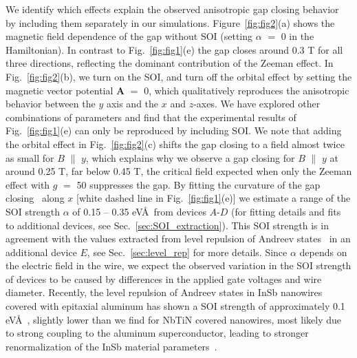 We identify which effects explain the observed anisotropic gap closing behavior by including them separately in our simulations.
Figure~\ref{fig:fig2}(a) shows the magnetic field dependence of the gap without SOI (setting $\alpha$ $=$ 0 in the Hamiltonian).
In contrast to Fig.~\ref{fig:fig1}(e) the gap closes around 0.3 T for all three directions, reflecting the dominant contribution of the Zeeman effect.
In Fig.~\ref{fig:fig2}(b), we turn on the SOI, and turn off the orbital effect by setting the magnetic vector potential $\mathbf{A}$ $=$ 0, which qualitatively reproduces the anisotropic behavior between the $y$ axis and the $x$ and $z$-axes.
We have explored other combinations of parameters and find that the experimental results of Fig.~\ref{fig:fig1}(e) can only be reproduced by including SOI.
We note that adding the orbital effect in Fig.~\ref{fig:fig2}(c) shifts the gap closing to a field almost twice as small for $B$ $\parallel$ $y$, which explains why we observe a gap closing for $B$ $\parallel$ $y$ at around 0.25 T, far below 0.45 T, the critical field expected when only the Zeeman effect with $g$ $=$ 50 suppresses the gap.
By fitting the curvature of the gap closing~\cite{Heck2017,Pan2019} along $x$ [white dashed line in Fig.~\ref{fig:fig1}(e)] we estimate a range of the SOI strength $\alpha$ of 0.15 -- 0.35 eV\AA\ from devices $A$-$D$ (for fitting details and fits to additional devices, see Sec.~\ref{sec:SOI_extraction}).
This SOI strength is in \mbox{agreement} with the values extracted from level repulsion of Andreev states~\cite{Stanescu2013,Moor2018} in an additional device $E$, see Sec.~\ref{sec:level_rep} for more details.
\mbox{Since} $\alpha$ depends on the electric field in the wire, we expect the observed variation in the SOI strength of devices to be caused by differences in the applied gate voltages and wire diameter.
Recently, the level repulsion of Andreev states in InSb nanowires covered with epitaxial aluminum has shown a SOI strength of approximately 0.1 eV\AA~\cite{Moor2018}, slightly lower than we find for NbTiN covered nanowires, most likely due to strong coupling to the aluminum superconductor, leading to stronger renormalization of the InSb material parameters~\cite{Stanescu2011,Cole2015,Antipov2018,Woods2018,Mikkelsen2018,Reeg2018}.

